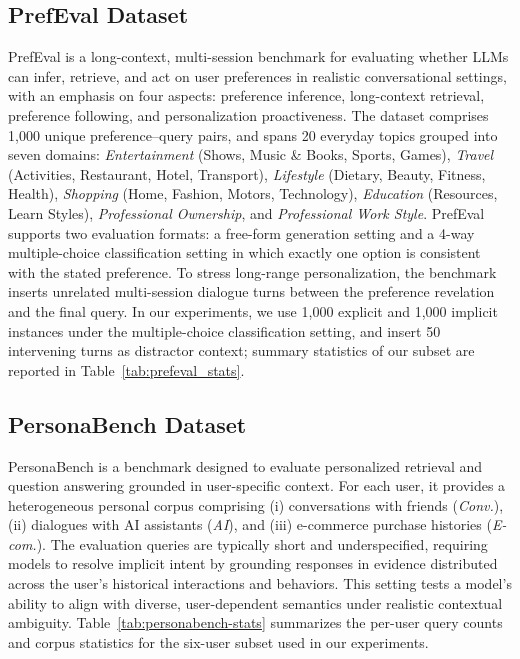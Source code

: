 \subsection{PrefEval Dataset}
PrefEval is a long-context, multi-session benchmark for evaluating whether LLMs can infer, retrieve, and act on user preferences in realistic conversational settings, with an emphasis on four aspects: preference inference, long-context retrieval, preference following, and personalization proactiveness. The dataset comprises 1{,}000 unique preference--query pairs, and spans 20 everyday topics grouped into seven domains: \textit{Entertainment} (Shows, Music \& Books, Sports, Games), \textit{Travel} (Activities, Restaurant, Hotel, Transport), \textit{Lifestyle} (Dietary, Beauty, Fitness, Health), \textit{Shopping} (Home, Fashion, Motors, Technology), \textit{Education} (Resources, Learn Styles), \textit{Professional Ownership}, and \textit{Professional Work Style}. PrefEval supports two evaluation formats: a free-form generation setting and a 4-way multiple-choice classification setting in which exactly one option is consistent with the stated preference. To stress long-range personalization, the benchmark inserts unrelated multi-session dialogue turns between the preference revelation and the final query. In our experiments, we use 1{,}000 explicit and 1{,}000 implicit instances under the multiple-choice classification setting, and insert 50 intervening turns as distractor context; summary statistics of our subset are reported in Table~\ref{tab:prefeval_stats}.


\subsection{PersonaBench Dataset}

PersonaBench \cite{tan2025personabench} is a benchmark designed to evaluate personalized retrieval and question answering grounded in user-specific context. For each user, it provides a heterogeneous personal corpus comprising (i) conversations with friends (\textit{Conv.}), (ii) dialogues with AI assistants (\textit{AI}), and (iii) e-commerce purchase histories (\textit{E-com.}). The evaluation queries are typically short and underspecified, requiring models to resolve implicit intent by grounding responses in evidence distributed across the user’s historical interactions and behaviors. This setting tests a model’s ability to align with diverse, user-dependent semantics under realistic contextual ambiguity. Table~\ref{tab:personabench-stats} summarizes the per-user query counts and corpus statistics for the six-user subset used in our experiments.


